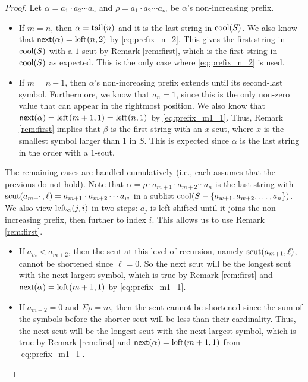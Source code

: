 \begin{proof}
Let $\alpha = a_1 \cdot a_2 \cdots a_n$ and $\rho = a_1 \cdot a_2 \cdots a_m$ be $\alpha$'s non-increasing prefix.

\begin{itemize}[nosep]
\item If $m=n$, then $\alpha = \tail(n)$ and it is the last string in $\cool{S}$.
We also know that $\nextPrefix{\alpha} = \leftshift{n}{2}$ by \eqref{eq:prefix_n_2}.
This gives the first string in $\cool{S}$ with a $1$-scut by Remark \ref{rem:first}, which is the first string in $\cool{S}$ as expected.
This is the only case where \eqref{eq:prefix_n_2} is used.
\item If $m=n-1$, then $\alpha$'s non-increasing prefix extends until its second-last symbol.
Furthermore, we know that $a_n = 1$, since this is the only non-zero value that can appear in the rightmost position.
We also know that $\nextPrefix{\alpha} = \leftshift{m+1}{1} = \leftshift{n}{1}$ by \eqref{eq:prefix_m1_1}.
Thus, Remark \ref{rem:first} implies that $\beta$ is the first string with an $x$-scut, where $x$ is the smallest symbol larger than $1$ in $S$.
This is expected since $\alpha$ is the last string in the order with a $1$-scut.
\end{itemize}
\noindent
The remaining cases are handled cumulatively (i.e., each assumes that the previous do not hold).
Note that $\alpha = \rho \cdot a_{m+1} \cdot a_{m+2} \cdots a_n$ is the last string with $\scut(a_{m+1}, \ell) = a_{m+1} \cdot a_{m+2} \cdots a_{w}$ in a sublist $\cool{S- \{a_{w+1}, a_{w+2}, \ldots, a_n\}}$.
We also view $\leftshift[\alpha]{j}{i}$ in two steps:
$a_j$ is left-shifted until it joins the non-increasing prefix, then further to index $i$.
This allows us to use Remark \ref{rem:first}. 
\begin{itemize}[nosep]
    \item If $a_m < a_{m+2}$, then the scut at this level of recursion, namely $\scut(a_{m+1}, \ell)$, cannot be shortened since $\ell=0$.
    So the next scut will be the longest scut with the next largest symbol, which is true by Remark \ref{rem:first} and $\nextPrefix{\alpha} = \leftshift{m+1}{1}$ by \eqref{eq:prefix_m1_1}.
    \item If $a_{m+2} = 0$ and $\Sigma \rho = m$, then the scut cannot be shortened since the sum of the symbols before the shorter scut will be less than their cardinality.
    Thus, the next scut will be the longest scut with the next largest symbol, which is true by Remark \ref{rem:first} and $\nextPrefix{\alpha} = \leftshift{m+1}{1}$ from  \eqref{eq:prefix_m1_1}.

\end{itemize}
\end{proof}
